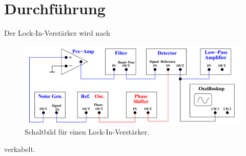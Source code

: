 \section{Durchführung}
\label{sec:Durchführung}


Der Lock-In-Verstärker wird nach 

\begin{figure}
    \centering
    \includegraphics[width=\textwidth/2]{images/bild3.png}
    \caption{Schaltbild für einen Lock-In-Verstärker.\cite{V303}}
    \label{fig:bild3}
\end{figure}

verkabelt.